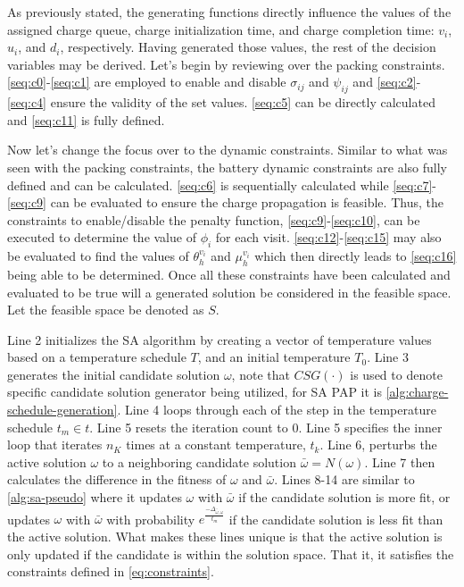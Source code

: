 \documentclass[11pt,a4paper,final]{article}
\newcommand{\Tau}{T}                        %
\begin{document}
As previously stated, the generating functions directly influence the values of the assigned charge queue, charge
initialization time, and charge completion time: \(v_i\), \(u_i\), and \(d_i\), respectively. Having generated those values,
the rest of the decision variables may be derived. Let's begin by reviewing over the packing constraints.
\ref{seq:c0}-\ref{seq:c1} are employed to enable and disable \(\sigma_{ij}\) and \(\psi_{ij}\) and \ref{seq:c2}-\ref{seq:c4} ensure
the validity of the set values. \ref{seq:c5} can be directly calculated and \ref{seq:c11} is fully defined.

Now let's change the focus over to the dynamic constraints. Similar to what was seen with the packing constraints, the
battery dynamic constraints are also fully defined and can be calculated. \ref{seq:c6} is sequentially calculated while
\ref{seq:c7}-\ref{seq:c9} can be evaluated to ensure the charge propagation is feasible. Thus, the constraints to
enable/disable the penalty function, \ref{seq:c9}-\ref{seq:c10}, can be executed to determine the value of \(\phi_i\) for
each visit. \ref{seq:c12}-\ref{seq:c15} may also be evaluated to find the values of \(\theta_h^{v_i}\) and \(\mu_h^{v_i}\) which
then directly leads to \ref{seq:c16} being able to be determined. Once all these constraints have been calculated and
evaluated to be true will a generated solution be considered in the feasible space. Let the feasible space be denoted as
\(S\).

Line 2 initializes the SA algorithm by creating a vector of temperature values based on a temperature schedule \(\Tau\),
and an initial temperature \(\Tau_0\). Line 3 generates the initial candidate solution \(\omega\), note that \(CSG(\cdot)\) is used to
denote specific candidate solution generator being utilized, for SA PAP it is \ref{alg:charge-schedule-generation}. Line
4 loops through each of the step in the temperature schedule \(t_m \in t\). Line 5 resets the iteration count to 0. Line 5
specifies the inner loop that iterates \(n_K\) times at a constant temperature, \(t_k\). Line 6, perturbs the active
solution \(\omega\) to a neighboring candidate solution \(\bar{\omega} = N(\omega)\). Line 7 then calculates the difference in the fitness
of \(\omega\) and \(\bar{\omega}\). Lines 8-14 are similar to \ref{alg:sa-pseudo} where it updates \(\omega\) with \(\bar{\omega}\) if the candidate
solution is more fit, or updates \(\omega\) with \(\bar{\omega}\) with probability \(e^{\frac{-\Delta_{\bar{\omega},\omega}}{t_m}}\) if the candidate
solution is less fit than the active solution. What makes these lines unique is that the active solution is only updated
if the candidate is within the solution space. That it, it satisfies the constraints defined in \ref{eq:constraints}.
\end{document}
